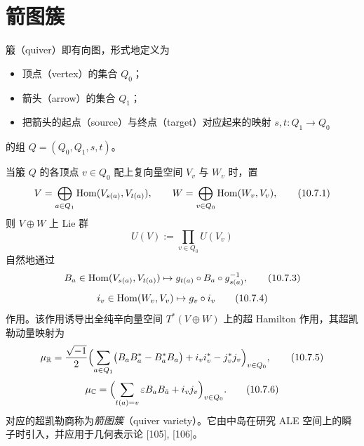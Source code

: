 

\section{箭图簇}

箙（quiver）即有向图，形式地定义为
\begin{itemize}
  \item 顶点（vertex）的集合 $Q_0$；
  \item 箭头（arrow）的集合 $Q_1$；
  \item 把箭头的起点（source）与终点（target）对应起来的映射 $s,t\colon Q_1\to Q_0$
\end{itemize}
的组 $Q=(Q_0,Q_1,s,t)$。


当箙 $Q$ 的各顶点 $v\in Q_0$ 配上复向量空间 $V_v$ 与 $W_v$ 时，置
\begin{equation}
  V=\bigoplus_{a\in Q_1}\operatorname{Hom}(V_{s(a)},V_{t(a)}),\qquad
  W=\bigoplus_{v\in Q_0}\operatorname{Hom}(W_v,V_v), \tag{10.7.1}
\end{equation}
则 $V\oplus W$ 上 Lie 群
\begin{equation}
  U(V):=\prod_{v\in Q_0}U(V_v) \tag{10.7.2}
\end{equation}
自然地通过
\begin{equation}
  B_a\in\operatorname{Hom}(V_{s(a)},V_{t(a)})\mapsto g_{t(a)}\circ B_a\circ g_{s(a)}^{-1}, \tag{10.7.3}
\end{equation}
\begin{equation}
  i_v\in\operatorname{Hom}(W_v,V_v)\mapsto g_v\circ i_v \tag{10.7.4}
\end{equation}
作用。该作用诱导出全纯辛向量空间 $T^*(V\oplus W)$ 上的超 Hamilton 作用，其超凯勒动量映射为
\begin{equation}
  \mu_{\mathbb{R}}=\frac{\sqrt{-1}}{2}\Bigl(\sum_{a\in Q_1}\bigl(B_aB_a^*-B_a^*B_a\bigr)
  +i_vi_v^*-j_v^*j_v\Bigr)_{v\in Q_0}, \tag{10.7.5}
\end{equation}
\begin{equation}
  \mu_{\mathbb{C}}=\Bigl(\sum_{t(a)=v}\varepsilon B_aB_{\bar a}+i_vj_v\Bigr)_{v\in Q_0}. \tag{10.7.6}
\end{equation}
对应的超凯勒商称为\emph{箭图簇}（quiver variety）。它由中岛在研究 ALE 空间上的瞬子时引入，并应用于几何表示论 [105], [106]。

